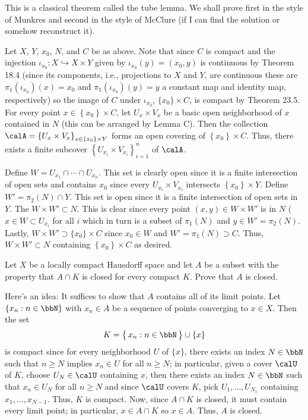 \begin{solution}
  This is a classical theorem called the tube lemma. We shall prove first
  in the style of Munkres and second in the style of McClure (if I can find
  the solution or somehow reconstruct it).

  Let \(X\), \(Y\), \(x_0\), \(N\), and \(C\) be as above. Note that since
  \(C\) is compact and the injection
  \(\iota_{x_0}\colon X\hookrightarrow X\times Y\) given by
  \(\iota_{x_0}(y)=(x_0,y)\) is continuous by Theorem 18.4 (since its
  components, i.e., projections to \(X\) and \(Y\), are continuous these
  are \(\pi_1(\iota_{x_0})(x)=x_0\) and \(\pi_1(\iota_{x_0})(y)=y\) a
  constant map and identity map, respectively) so the image of \(C\) under
  \(\iota_{x_0}\), \(\{x_0\}\times C\), is compact by Theorem 23.5. For
  every point \(x\in\left\{x_0\right\}\times C\), let \(U_x\times V_x\) be
  a basic open neighborhood of \(x\) contained in \(N\) (this can be
  arranged by Lemma C). Then the collection
  \(\calA=\left\{U_x\times V_x\right\}_{x\in\left\{x_0\right\}\times Y}\)
  forms an open covering of \(\left\{x_0\right\}\times C\). Thus, there
  exists a finite subcover \(\left\{U_{x_i}\times V_{x_i}\right\}_{i=1}^n\)
  of \(\calA\).

  Define \(W= U_{x_1}\cap\dotsb\cap U_{x_n}\). This set is clearly open
  since it is a finite intersection of open sets and contains \(x_0\) since
  every \(U_{x_i}\times V_{x_i}\) intersects
  \(\left\{x_0\right\}\times Y\). Define \(W'=\pi_2(N)\cap Y\). This set is
  open since it is a finite intersection of open sets in \(Y\). The
  \(W\times W'\subset N\). This is clear since every point
  \((x,y)\in W\times W'\) is in \(N\) (\(x\in W\subset U_{x_i}\) for all
  \(i\) which in turn is a subset of \(\pi_1(N)\) and \(y\in
  W'=\pi_2(N)\). Lastly, \(W\times W'\supset \{x_0\}\times C\) since
  \(x_0\in W\) and \(W'=\pi_1(N)\supset C\). Thus,
  \(W\times W'\subset N\) containing \(\left\{x_0\right\}\times C\) as
  desired.
\end{solution}
\begin{problem}
  Let \(X\) be a locally compact Hausdorff space and let \(A\) be a subset
  with the property that \(A\cap K\) is closed for every compact
  \(K\). Prove that \(A\) is closed.
\end{problem}
\begin{solution}
  Here's an idea: It suffices to show that \(A\) contains all of its limit
  points. Let \(\{x_n:n\in\bbN\}\) with \(x_n\in A\) be a sequence of
  points converging to \(x\in X\). Then the set
  \[
    K=\bigl\{\,x_n:n\in\bbN\,\bigr\}\cup\{x\}
  \]
  is compact since for every neighborhood \(U\) of \(\{x\}\), there exists
  an index \(N\in\bbN\) such that \(n\geq N\) implies \(x_n\in U\) for all
  \(n\geq N\); in particular, given a cover \(\calU\) of \(K\), choose
  \(U_N\in\calU\) containing \(x\), then there exists an index \(N\in\bbN\)
  such that \(x_n\in U_N\) for all \(n\geq N\) and since \(\calU\) covers
  \(K\), pick \(U_1,\dotsc,U_{N_1}\) containing
  \(x_1,\dotsc,x_{N-1}\). Thus, \(K\) is compact. Now, since \(A\cap K\) is
  closed, it must contain every limit point; in particular, \(x\in A\cap
  K\) so \(x\in A\). Thus, \(A\) is closed.
\end{solution}
